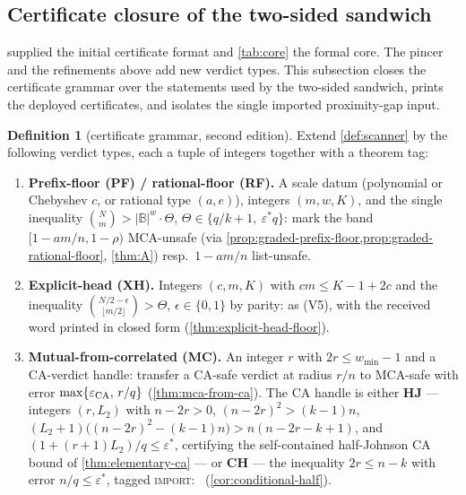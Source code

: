 \documentclass[11pt]{article}
\theoremstyle{definition}
\newtheorem{definition}[definition]{Definition}
\theoremstyle{remark}
\newcommand{\B}{\mathbb{B}}
\begin{document}
\subsection{Certificate closure of the two-sided sandwich}\label{sec:answers-T7}

 supplied the initial certificate format and \cref{tab:core} the formal core.  The pincer and the refinements above add new verdict types.  This subsection closes the certificate grammar over the statements used by the two-sided sandwich, prints the deployed certificates, and isolates the single imported proximity-gap input.

\begin{definition}[certificate grammar, second edition]\label{def:certificate-v2}
Extend \cref{def:scanner} by the following verdict types, each a tuple of integers together with a theorem tag:
\begin{enumerate}[label=\textup{(V\arabic*)},leftmargin=2.6em,start=5]
\item \textbf{Prefix-floor \textup(PF\textup) / rational-floor \textup(RF\textup).} A scale datum \textup(polynomial or Chebyshev $c$, or rational type $(a,e)$\textup), integers $(m,w,K)$, and the single inequality $\binom Nm>|\B|^w\cdot\Theta$, $\Theta\in\{q/k+1,\ \varepsilon^*q\}$: mark the band $[1-am/n,1-\rho)$ MCA-unsafe \textup(via \cref{prop:graded-prefix-floor,prop:graded-rational-floor}, \cref{thm:A}\textup) resp.\ $1-am/n$ list-unsafe.
\item \textbf{Explicit-head \textup(XH\textup).} Integers $(c,m,K)$ with $cm\le K-1+2c$ and the inequality $\binom{N/2-\epsilon}{\lfloor m/2\rfloor}>\Theta$, $\epsilon\in\{0,1\}$ by parity: as \textup{(V5)}, with the received word printed in closed form \textup(\cref{thm:explicit-head-floor}\textup).
\item \textbf{Mutual-from-correlated \textup(MC\textup).} An integer $r$ with $2r\le w_{\min}-1$ and a CA-verdict handle: transfer a CA-safe verdict at radius $r/n$ to MCA-safe with error $\max\{\varepsilon_{\rm CA},\,r/q\}$ \textup(\cref{thm:mca-from-ca}\textup). The CA handle is either \textbf{HJ} --- integers $(r,L_2)$ with $n-2r>0$, $(n-2r)^2>(k-1)n$, $(L_2+1)\bigl((n-2r)^2-(k-1)n\bigr)>n(n-2r-k+1)$, and $(1+(r+1)L_2)/q\le\varepsilon^*$, certifying the self-contained half-Johnson CA bound of \cref{thm:elementary-ca} --- or \textbf{CH} --- the inequality $2r\le n-k$ with error $n/q\le\varepsilon^*$, tagged \textup{\textsc{import}}:~\cite[Thm.~4.1]{BCIKS20} \textup(\cref{cor:conditional-half}\textup).

\end{enumerate}
\end{definition}
\end{document}
